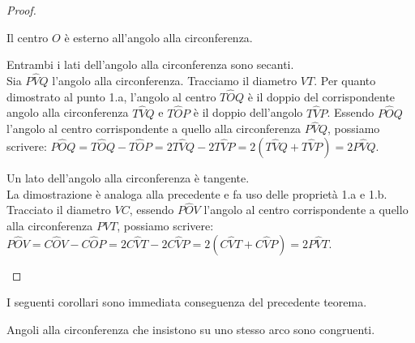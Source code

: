 \begin{proof}
\begin{enumerate*}
\item Il centro \(O\) è esterno all'angolo alla circonferenza.
\begin{enumerate*}
\noindent\begin{minipage}{0.6\textwidth}\parindent15pt
\item Entrambi i lati dell'angolo alla circonferenza sono secanti.\\
Sia \(P\widehat{V}Q\) l'angolo alla circonferenza. Tracciamo il 
diametro \(VT\). Per quanto dimostrato al punto 1.a, l'angolo al centro 
\(T\widehat{O}Q\) è il doppio del corrispondente angolo alla 
circonferenza \(T\widehat{V}Q\) e \(T\widehat{O}P\) è il doppio 
dell'angolo \(T\widehat{V}P\). Essendo \(P\widehat{O}Q\) l'angolo al 
centro corrispondente a quello alla circonferenza \(P\widehat{V}Q\), 
possiamo  scrivere: 
\(P\widehat{O}Q=T\widehat{O}Q-T\widehat{O}P=2T\widehat{V}Q-2T\widehat{V
} P=2(T\widehat{V}Q+T\widehat{V}P)=2P\widehat{V}Q\).
\end{minipage}\hfil
\noindent\hspace{-20pt}\begin{minipage}{0.4\textwidth}
  \centering
\end{minipage}
\noindent\begin{minipage}{0.6\textwidth}\parindent15pt
\item Un lato dell'angolo alla circonferenza è tangente.\\
La dimostrazione è analoga alla precedente e fa uso delle proprietà 
1.a e 1.b. Tracciato il diametro \(VC\), essendo \(P\widehat{O}V\) 
l'angolo al centro corrispondente a quello alla circonferenza 
\(P\widehat{V}T\), possiamo scrivere: 
\(P\widehat{O}V=C\widehat{O}V-C\widehat{O}P=2C\widehat{V}T-2C\widehat{V
} P=2(C\widehat{V}T+C\widehat{V}P)=2P\widehat{V}T\).
\end{minipage}\hfil
\noindent\hspace{-20pt}\begin{minipage}{0.4\textwidth}
  \centering
\end{minipage}
\end{enumerate*}
\end{enumerate*}
\end{proof}

I seguenti corollari sono immediata conseguenza del precedente 
teorema.
\begin{corollario}
Angoli alla circonferenza che insistono su uno stesso arco sono 
congruenti.
\end{corollario}

